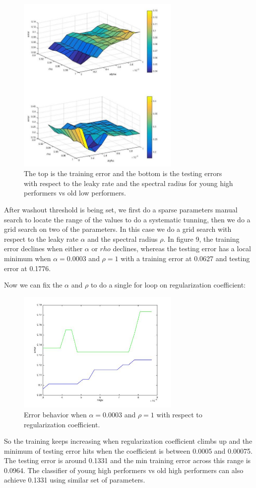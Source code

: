 \documentclass[a4paper,11pt,oneside]{article}
\begin{document}
\begin{figure}[h]
	\centering
	\includegraphics[width=0.7\textwidth]{img/pair}
	\caption{The top is the training error and the bottom is the testing errors with respect to the leaky rate and the spectral radius for young high performers vs old low performers.}
\end{figure}
After washout threshold is being set, we first do a sparse parameters manual search to locate the range of the values to do a systematic tunning, then we do a grid search on two of the parameters. In this case we do a grid search with respect to the leaky rate $\alpha$ and the spectral radius $\rho$.  In figure 9, the training error declines when either $\alpha$ or $rho$ declines, whereas the testing error has a local minimum when $\alpha = 0.0003$ and $ \rho = 1$ with a training error at 0.0627 and testing error at 0.1776. 

Now we can fix the $\alpha$ and $\rho$ to do a single for loop on regularization coefficient:  
\begin{figure}[h]
	\centering
	\includegraphics[width=0.7\textwidth]{img/regu}
	\caption{Error behavior when $\alpha = 0.0003$ and $ \rho = 1$ with respect to regularization coefficient.}
\end{figure}
So the training keeps increasing when regularization coefficient climbs up and the minimum of testing error hits when the coefficient is between 0.0005 and 0.00075. The testing error is around 0.1331 and the min training error across this range is 0.0964. The classifier of young high performers vs old high performers can also achieve 0.1331 using similar set of parameters.
\end{document}
